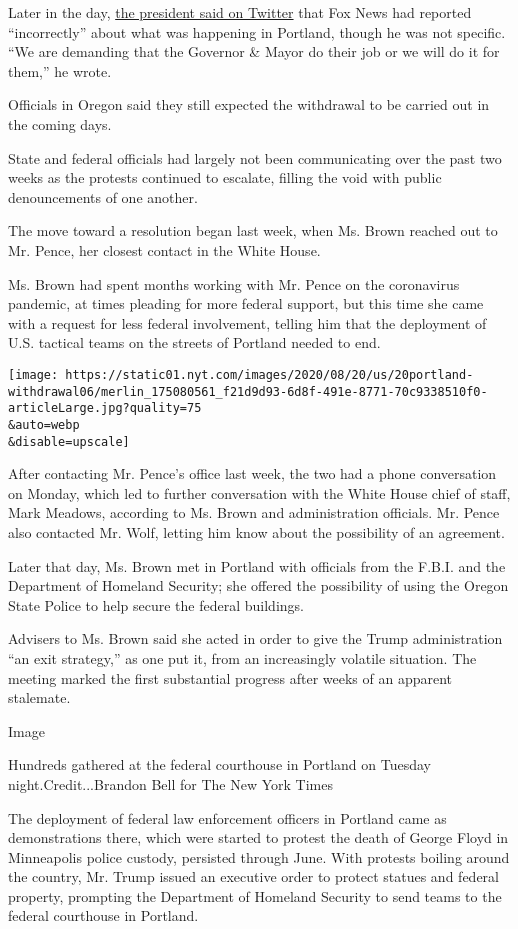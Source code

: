 Later in the day,
\href{https://twitter.com/realDonaldTrump/status/1288599151349923840}{the
president said on Twitter} that Fox News had reported ``incorrectly''
about what was happening in Portland, though he was not specific. ``We
are demanding that the Governor \& Mayor do their job or we will do it
for them,'' he wrote.

Officials in Oregon said they still expected the withdrawal to be
carried out in the coming days.

State and federal officials had largely not been communicating over the
past two weeks as the protests continued to escalate, filling the void
with public denouncements of one another.

The move toward a resolution began last week, when Ms. Brown reached out
to Mr. Pence, her closest contact in the White House.

Ms. Brown had spent months working with Mr. Pence on the coronavirus
pandemic, at times pleading for more federal support, but this time she
came with a request for less federal involvement, telling him that the
deployment of U.S. tactical teams on the streets of Portland needed to
end.

\texttt{[image: https://static01.nyt.com/images/2020/08/20/us/20portland-withdrawal06/merlin\_175080561\_f21d9d93-6d8f-491e-8771-70c9338510f0-articleLarge.jpg?quality=75\\\&auto=webp\\\&disable=upscale]}

After contacting Mr. Pence's office last week, the two had a phone
conversation on Monday, which led to further conversation with the White
House chief of staff, Mark Meadows, according to Ms. Brown and
administration officials. Mr. Pence also contacted Mr. Wolf, letting him
know about the possibility of an agreement.

Later that day, Ms. Brown met in Portland with officials from the F.B.I.
and the Department of Homeland Security; she offered the possibility of
using the Oregon State Police to help secure the federal buildings.

Advisers to Ms. Brown said she acted in order to give the Trump
administration ``an exit strategy,'' as one put it, from an increasingly
volatile situation. The meeting marked the first substantial progress
after weeks of an apparent stalemate.

Image

Hundreds gathered at the federal courthouse in Portland on Tuesday
night.Credit...Brandon Bell for The New York Times

The deployment of federal law enforcement officers in Portland came as
demonstrations there, which were started to protest the death of George
Floyd in Minneapolis police custody, persisted through June. With
protests boiling around the country, Mr. Trump issued an executive order
to protect statues and federal property, prompting the Department of
Homeland Security to send teams to the federal courthouse in Portland.


